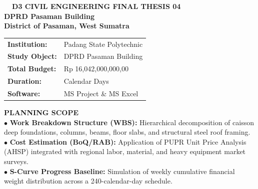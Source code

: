 \documentclass[10pt,a4paper,landscape]{article}
\begin{document}
\noindent
\begin{minipage}[t]{0.30\linewidth}
  \vspace{0pt}
  \begin{tcolorbox}[sharp corners, boxrule=0.8pt, colframe=pborder, colback=white, left=3mm, right=3mm, top=2.5mm, bottom=2.5mm, height=98mm]
    \colorbox{pred}{\fontsize{7pt}{8pt}\selectfont\bfseries\color{white}\ \ D3 CIVIL ENGINEERING FINAL THESIS 04\ \ }\\[1.5mm]
    {\fontsize{9.5pt}{11.5pt}\selectfont\bfseries\color{pnavy}DPRD Pasaman Building}\\[0.5mm]
    {\fontsize{7pt}{8.5pt}\selectfont\bfseries\color{pred}District of Pasaman, West Sumatra}\\[2mm]

    \begin{tcolorbox}[sharp corners, boxrule=0.5pt, colframe=pborder, colback=pbglight, left=2mm, right=2mm, top=1.5mm, bottom=1.5mm]
      \begin{tabularx}{\linewidth}{@{}p{22mm} X@{}}
        {\fontsize{6.8pt}{8pt}\selectfont\bfseries Institution:} & {\fontsize{6.8pt}{8pt}\selectfont Padang State Polytechnic} \\[0.8mm]
        {\fontsize{6.8pt}{8pt}\selectfont\bfseries Study Object:} & {\fontsize{6.8pt}{8pt}\selectfont DPRD Pasaman Building} \\[0.8mm]
        {\fontsize{6.8pt}{8pt}\selectfont\bfseries Total Budget:} & {\fontsize{6.8pt}{8pt}\selectfont Rp 16,042,000,000,00} \\[0.8mm]
        {\fontsize{6.8pt}{8pt}\selectfont\bfseries Duration:} & {\fontsize{6.8pt}{8pt}\selectfont 240 Calendar Days} \\[0.8mm]
        {\fontsize{6.8pt}{8pt}\selectfont\bfseries Software:} & {\fontsize{6.8pt}{8pt}\selectfont MS Project \& MS Excel}
      \end{tabularx}
    \end{tcolorbox}
    \vspace{1.5mm}

    {\fontsize{7.5pt}{9pt}\selectfont\bfseries\color{pnavy}PLANNING SCOPE}\\[0.8mm]
    {\fontsize{6.5pt}{8.2pt}\selectfont\color{psteel}
    $\bullet$ \textbf{Work Breakdown Structure (WBS):} Hierarchical decomposition of caisson deep foundations, columns, beams, floor slabs, and structural steel roof framing.\\
    $\bullet$ \textbf{Cost Estimation (BoQ/RAB):} Application of PUPR Unit Price Analysis (AHSP) integrated with regional labor, material, and heavy equipment market surveys.\\
    $\bullet$ \textbf{S-Curve Progress Baseline:} Simulation of weekly cumulative financial weight distribution across a 240-calendar-day schedule.
    }
  \end{tcolorbox}
  \vspace{2mm}


\end{minipage}
\end{document}
